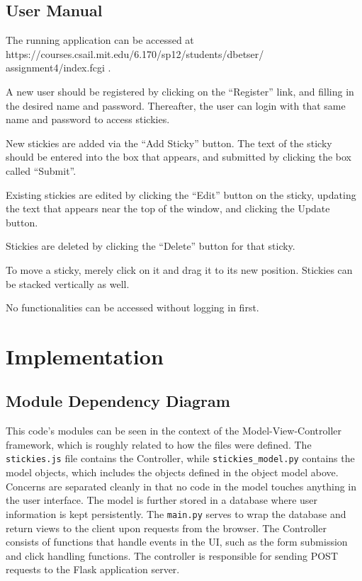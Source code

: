 \documentclass[11pt,letterpaper]{article}
\begin{document}
\subsection{User Manual}
The running application can be accessed at https://courses.csail.mit.edu/6.170/sp12/students/dbetser/
assignment4/index.fcgi .

A new user should be registered by clicking on the ``Register'' link, and filling in the desired name and password. Thereafter, the user can login with that same name and password to access stickies.

New stickies are added via the ``Add Sticky'' button. The text of the sticky should be entered into the box that appears, and submitted by clicking the box called ``Submit''.

Existing stickies are edited by clicking the ``Edit'' button on the sticky, updating the text that appears near the top of the window, and clicking the Update button.

Stickies are deleted by clicking the ``Delete'' button for that sticky.

To move a sticky, merely click on it and drag it to its new position. Stickies can be stacked vertically as well.

No functionalities can be accessed without logging in first.

\section{Implementation}

\subsection{Module Dependency Diagram}
This code's modules can be seen in the context of the Model-View-Controller framework, which is roughly related to how the files were defined. The \texttt{stickies.js} file contains the Controller, while \texttt{stickies\_model.py} contains the model objects, which includes the objects defined in the object model above. Concerns are separated cleanly in that no code in the model touches anything in the user interface. The model is further stored in a database where user information is kept persistently. The \texttt{main.py} serves to wrap the database and return views to the client upon requests from the browser. The Controller consists of functions that handle events in the UI, such as the form submission and click handling functions. The controller is responsible for sending POST requests to the Flask application server.
\end{document}
